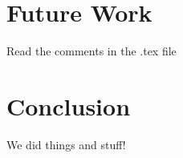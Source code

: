 \section{Future Work}
	\label{sec:FutureStuff}
	Read the comments in the .tex file

\section{Conclusion}
	\label{sec:Conclusionn}
	We did things and stuff!